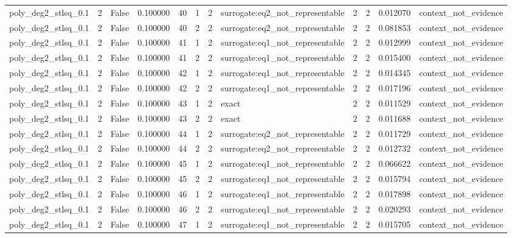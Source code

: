 \begin{tabular}{lrrrrrrlrrrl}
poly\_deg2\_stlsq\_0.1 & 2 & False & 0.100000 & 40 & 1 & 2 & surrogate:eq2\_not\_representable & 2 & 2 & 0.012070 & context\_not\_evidence \\
poly\_deg2\_stlsq\_0.1 & 2 & False & 0.100000 & 40 & 2 & 2 & surrogate:eq2\_not\_representable & 2 & 2 & 0.081853 & context\_not\_evidence \\
poly\_deg2\_stlsq\_0.1 & 2 & False & 0.100000 & 41 & 1 & 2 & surrogate:eq1\_not\_representable & 2 & 2 & 0.012999 & context\_not\_evidence \\
poly\_deg2\_stlsq\_0.1 & 2 & False & 0.100000 & 41 & 2 & 2 & surrogate:eq1\_not\_representable & 2 & 2 & 0.015400 & context\_not\_evidence \\
poly\_deg2\_stlsq\_0.1 & 2 & False & 0.100000 & 42 & 1 & 2 & surrogate:eq1\_not\_representable & 2 & 2 & 0.014345 & context\_not\_evidence \\
poly\_deg2\_stlsq\_0.1 & 2 & False & 0.100000 & 42 & 2 & 2 & surrogate:eq1\_not\_representable & 2 & 2 & 0.017196 & context\_not\_evidence \\
poly\_deg2\_stlsq\_0.1 & 2 & False & 0.100000 & 43 & 1 & 2 & exact & 2 & 2 & 0.011529 & context\_not\_evidence \\
poly\_deg2\_stlsq\_0.1 & 2 & False & 0.100000 & 43 & 2 & 2 & exact & 2 & 2 & 0.011688 & context\_not\_evidence \\
poly\_deg2\_stlsq\_0.1 & 2 & False & 0.100000 & 44 & 1 & 2 & surrogate:eq2\_not\_representable & 2 & 2 & 0.011729 & context\_not\_evidence \\
poly\_deg2\_stlsq\_0.1 & 2 & False & 0.100000 & 44 & 2 & 2 & surrogate:eq2\_not\_representable & 2 & 2 & 0.012732 & context\_not\_evidence \\
poly\_deg2\_stlsq\_0.1 & 2 & False & 0.100000 & 45 & 1 & 2 & surrogate:eq1\_not\_representable & 2 & 2 & 0.066622 & context\_not\_evidence \\
poly\_deg2\_stlsq\_0.1 & 2 & False & 0.100000 & 45 & 2 & 2 & surrogate:eq1\_not\_representable & 2 & 2 & 0.015794 & context\_not\_evidence \\
poly\_deg2\_stlsq\_0.1 & 2 & False & 0.100000 & 46 & 1 & 2 & surrogate:eq1\_not\_representable & 2 & 2 & 0.017898 & context\_not\_evidence \\
poly\_deg2\_stlsq\_0.1 & 2 & False & 0.100000 & 46 & 2 & 2 & surrogate:eq1\_not\_representable & 2 & 2 & 0.020293 & context\_not\_evidence \\
poly\_deg2\_stlsq\_0.1 & 2 & False & 0.100000 & 47 & 1 & 2 & surrogate:eq1\_not\_representable & 2 & 2 & 0.015705 & context\_not\_evidence \\

\end{tabular}
